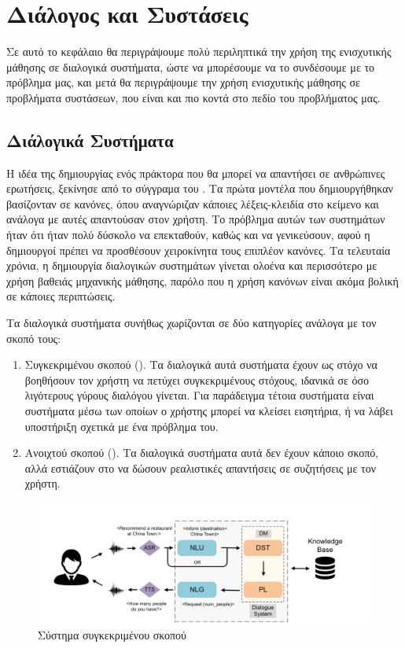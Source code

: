 \chapter{Διάλογος και Συστάσεις}

Σε αυτό το κεφάλαιο θα περιγράψουμε πολύ περιληπτικά την χρήση της ενισχυτικής μάθησης σε διαλογικά συστήματα, ώστε να μπορέσουμε να το συνδέσουμε με το πρόβλημα μας, και μετά θα περιγράψουμε την χρήση ενισχυτικής μάθησης σε προβλήματα συστάσεων, που είναι και πιο κοντά στο πεδίο του προβλήματος μας.

\section{Διάλογικά Συστήματα}

Η ιδέα της δημιουργίας ενός πράκτορα που θα μπορεί να απαντήσει σε ανθρώπινες ερωτήσεις, ξεκίνησε από το σύγγραμα του  \cite{turing1950computing}. Τα πρώτα μοντέλα που δημιουργήθηκαν βασίζονταν σε κανόνες, όπου αναγνώριζαν κάποιες λέξεις-κλειδία στο κείμενο και ανάλογα με αυτές απαντούσαν στον χρήστη. Το πρόβλημα αυτών των συστημάτων ήταν ότι ήταν πολύ δύσκολο να επεκταθούν, καθώς και να γενικεύσουν, αφού η δημιουργοί πρέπει να προσθέσουν χειροκίνητα τους επιπλέον κανόνες. Τα τελευταία χρόνια, η δημιουργία διαλογικών συστημάτων γίνεται ολοένα και περισσότερο με χρήση βαθειάς μηχανικής μάθησης, παρόλο που η χρήση κανόνων είναι ακόμα βολική σε κάποιες περιπτώσεις.

Tα διαλογικά συστήματα συνήθως χωρίζονται σε δύο κατηγορίες ανάλογα με τον σκοπό τους:
\begin{enumerate}
    \item Συγκεκριμένου σκοπού (). Τα διαλογικά αυτά συστήματα έχουν ως στόχο να βοηθήσουν τον χρήστη να πετύχει συγκεκριμένους στόχους, ιδανικά σε όσο λιγότερους γύρους διαλόγου γίνεται. Για παράδειγμα τέτοια συστήματα είναι συστήματα μέσω των οποίων ο χρήστης μπορεί να κλείσει εισητήρια, ή να λάβει υποστήριξη σχετικά με ένα πρόβλημα του.
    \item Ανοιχτού σκοπού (). Τα διαλογικά συστήματα αυτά δεν έχουν κάποιο σκοπό, αλλά εστιάζουν στο να δώσουν ρεαλιστικές απαντήσεις σε συζητήσεις με τον χρήστη.
\end{enumerate}

\begin{figure}
    \centering
    \includegraphics[width=\textwidth]{body_matter/dialogue_and_recommendations/images/task-based-dialogue-system.png}
    \caption{Σύστημα συγκεκριμένου σκοπού \cite{recent_advances_dl_2021}}
    \label{fig:task_based_system}
\end{figure}

